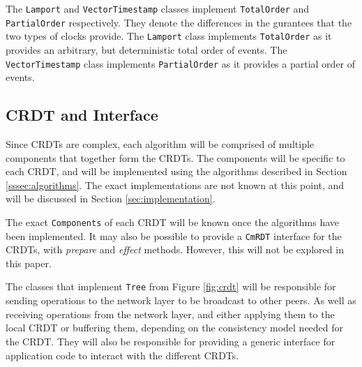 \documentclass[12pt]{report}
\begin{document}
The \texttt{Lamport} and \texttt{VectorTimestamp} classes implement \texttt{TotalOrder} and \texttt{PartialOrder} respectively. They denote the differences in the gurantees that the two types of clocks provide. The \texttt{Lamport} class implements \texttt{TotalOrder} as it provides an arbitrary, but deterministic total order of events. The \texttt{VectorTimestamp} class implements \texttt{PartialOrder} as it provides a partial order of events. \par

\subsection{CRDT and Interface}
Since CRDTs are complex, each algorithm will be comprised of multiple components that together form the CRDTs. The components will be specific to each CRDT, and will be implemented using the algorithms described in Section \ref{sssec:algorithms}. The exact implementations are not known at this point, and will be discussed in Section \ref{sec:implementation}. \par


The exact \texttt{Components} of each CRDT will be known once the algorithms have been implemented. It may also be possible to provide a \texttt{CmRDT} interface for the CRDTs, with \textit{prepare} and \textit{effect} methods. However, this will not be explored in this paper. \par

The classes that implement \texttt{Tree} from Figure \ref{fig:crdt} will be responsible for sending operations to the network layer to be broadcast to other peers. As well as receiving operations from the network layer, and either applying them to the local CRDT or buffering them, depending on the consistency model needed for the CRDT. They will also be responsible for providing a generic interface for application code to interact with the different CRDTs. \par
\end{document}
